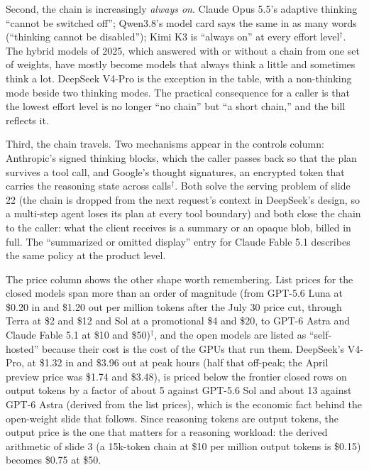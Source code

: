 \documentclass[11pt,letterpaper]{article}
\begin{document}
Second, the chain is increasingly \emph{always on}. Claude Opus 5.5's adaptive thinking ``cannot be switched off''; Qwen3.8's model card says the same in as many words (``thinking cannot be disabled''); Kimi K3 is ``always on'' at every effort level$^\dagger$. The hybrid models of 2025, which answered with or without a chain from one set of weights, have mostly become models that always think a little and sometimes think a lot. DeepSeek V4-Pro is the exception in the table, with a non-thinking mode beside two thinking modes. The practical consequence for a caller is that the lowest effort level is no longer ``no chain'' but ``a short chain,'' and the bill reflects it.

Third, the chain travels. Two mechanisms appear in the controls column: Anthropic's signed thinking blocks, which the caller passes back so that the plan survives a tool call, and Google's thought signatures, an encrypted token that carries the reasoning state across calls$^\dagger$. Both solve the serving problem of slide 22 (the chain is dropped from the next request's context in DeepSeek's design, so a multi-step agent loses its plan at every tool boundary) and both close the chain to the caller: what the client receives is a summary or an opaque blob, billed in full. The ``summarized or omitted display'' entry for Claude Fable 5.1 describes the same policy at the product level.

The price column shows the other shape worth remembering. List prices for the closed models span more than an order of magnitude (from GPT-5.6 Luna at \$0.20 in and \$1.20 out per million tokens after the July 30 price cut, through Terra at \$2 and \$12 and Sol at a promotional \$4 and \$20, to GPT-6 Astra and Claude Fable 5.1 at \$10 and \$50)$^\dagger$, and the open models are listed as ``self-hosted'' because their cost is the cost of the GPUs that run them. DeepSeek's V4-Pro, at \$1.32 in and \$3.96 out at peak hours (half that off-peak; the April preview price was \$1.74 and \$3.48), is priced below the frontier closed rows on output tokens by a factor of about 5 against GPT-5.6 Sol and about 13 against GPT-6 Astra (derived from the list prices), which is the economic fact behind the open-weight slide that follows. Since reasoning tokens are output tokens, the output price is the one that matters for a reasoning workload: the derived arithmetic of slide 3 (a 15k-token chain at \$10 per million output tokens is \$0.15) becomes \$0.75 at \$50.
\end{document}
